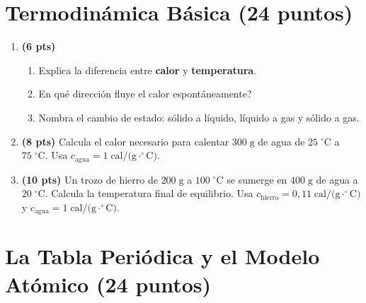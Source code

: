 \documentclass[12pt, letterpaper]{article}
\begin{document}
\newpage

\section{Termodinámica Básica (24 puntos)}

\begin{enumerate}[leftmargin=*]
  \item \textbf{(6 pts)}
        \begin{enumerate}[label=\alph*)]
          \item Explica la diferencia entre \textbf{calor} y \textbf{temperatura}.
          \item \textquestiondown En qué dirección fluye el calor espontáneamente?
          \item Nombra el cambio de estado: sólido a líquido, líquido a gas y sólido a gas.
        \end{enumerate}

  \item \textbf{(8 pts)} Calcula el calor necesario para calentar $300\;\text{g}$ de agua de $25\;^\circ\text{C}$ a $75\;^\circ\text{C}$. Usa $c_{\text{agua}} = 1\;\text{cal/(g}\cdot^\circ\text{C)}$.

  \item \textbf{(10 pts)} Un trozo de hierro de $200\;\text{g}$ a $100\;^\circ\text{C}$ se sumerge en $400\;\text{g}$ de agua a $20\;^\circ\text{C}$. Calcula la temperatura final de equilibrio. Usa $c_{\text{hierro}} = 0{,}11\;\text{cal/(g}\cdot^\circ\text{C)}$ y $c_{\text{agua}} = 1\;\text{cal/(g}\cdot^\circ\text{C)}$.
\end{enumerate}

\newpage

\section{La Tabla Periódica y el Modelo Atómico (24 puntos)}
\end{document}
